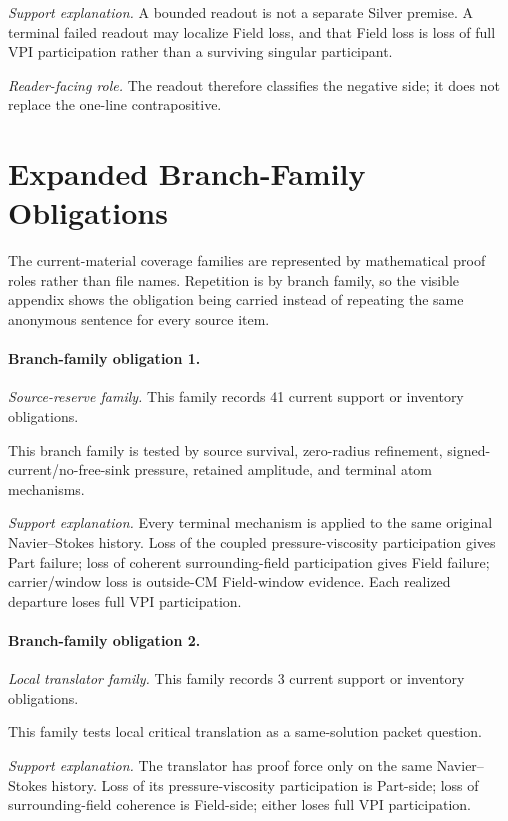 \emph{Support explanation.} A bounded readout is not a separate Silver premise. A terminal failed readout may localize Field loss, and that Field loss is loss of full VPI participation rather than a surviving singular participant.

\emph{Reader-facing role.} The readout therefore classifies the negative side; it does not replace the one-line contrapositive.


\section{Expanded Branch-Family Obligations}

The current-material coverage families are represented by mathematical proof roles rather than file names. Repetition is by branch family, so the visible appendix shows the obligation being carried instead of repeating the same anonymous sentence for every source item.

\paragraph{Branch-family obligation 1.}
\emph{Source-reserve family.} This family records 41 current support or inventory obligations.

This branch family is tested by source survival, zero-radius refinement, signed-current/no-free-sink pressure, retained amplitude, and terminal atom mechanisms.

\emph{Support explanation.} Every terminal mechanism is applied to the same original Navier--Stokes history. Loss of the coupled pressure-viscosity participation gives Part failure; loss of coherent surrounding-field participation gives Field failure; carrier/window loss is outside-CM Field-window evidence. Each realized departure loses full VPI participation.

\paragraph{Branch-family obligation 2.}
\emph{Local translator family.} This family records 3 current support or inventory obligations.

This family tests local critical translation as a same-solution packet question.

\emph{Support explanation.} The translator has proof force only on the same Navier--Stokes history. Loss of its pressure-viscosity participation is Part-side; loss of surrounding-field coherence is Field-side; either loses full VPI participation.

